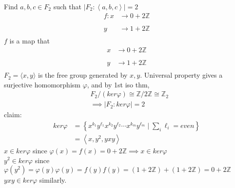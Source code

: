 \documentclass{article}
\begin{document}
\pagebreak

\begin{homeworkProblem}
    Find $a,b,c \in F_2 $ such that $\lvert F_2: \left\langle a,b,c \right\rangle \rvert = 2$\\
    \begin{align}
        f: x &\xrightarrow[]{} 0 + 2 \mathbb{Z}\\
        y &\xrightarrow[]{} 1 + 2 \mathbb{Z}
    \end{align}
    $f$ is a map that 
    \begin{align}
        x &\xrightarrow[]{} 0 + 2 \mathbb{Z}\\
        y &\xrightarrow[]{} 1 + 2 \mathbb{Z}
    \end{align}
    $F_2 = \langle x, y \rangle$ is the free group
    generated by $x,y$.
    Universal property gives a surjective homomorphism $\varphi$,
    and by 1st iso thm,
    \begin{align}
        &F_2 / (ker \varphi) \cong \mathbb{Z} / 2 \mathbb{Z} \cong \mathbb{Z}_2\\
        &\implies \lvert F_2 : ker \varphi \rvert = 2
    \end{align}
    claim: 
    \begin{align}
        ker \varphi &= \left\{ x^{k_1} y^{\ell_1} x^{k_2} y^{\ell_2} \cdots x^{k_m} y^{\ell_m} \mid \sum_i \ell_i = even \right\}\\
        &= \left\langle x, y^2, yxy \right\rangle
    \end{align}
    $x \in ker \varphi$ since $\varphi (x) = f(x) = 0 + 2 \mathbb{Z} \implies x \in ker \varphi$ \\
    $ y^2 \in ker \varphi$ since 
    $\varphi (y^2 ) = \varphi(y) \varphi(y) = f(y)f(y) = (1+2 \mathbb{Z}) + (1+ 2 \mathbb{Z}) = 0 + 2 \mathbb{Z}$\\
    $y x y \in ker \varphi$ similarly.\\


    
    
    
    

\end{homeworkProblem}
\end{document}
